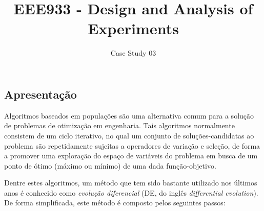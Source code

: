 \documentclass[11pt,twoside,printwatermark=false]{pinp}
\title{EEE933 - Design and Analysis of Experiments}
\author[]{Case Study 03}
\begin{document}
\verticaladjustment{-2pt}

\maketitle
\thispagestyle{firststyle}



\subsection{Apresentação}\label{apresentacao}

Algoritmos baseados em populações são uma alternativa comum para a
solução de problemas de otimização em engenharia. Tais algoritmos
normalmente consistem de um ciclo iterativo, no qual um conjunto de
soluções-candidatas ao problema são repetidamente sujeitas a operadores
de variação e seleção, de forma a promover uma exploração do espaço de
variáveis do problema em busca de um ponto de ótimo (máximo ou mínimo)
de uma dada função-objetivo.

Dentre estes algoritmos, um método que tem sido bastante utilizado nos
últimos anos é conhecido como \emph{evolução diferencial} (DE, do inglês
\emph{differential evolution})\citep{Storn1997}. De forma simplificada,
este método é composto pelos seguintes passos:
\end{document}
